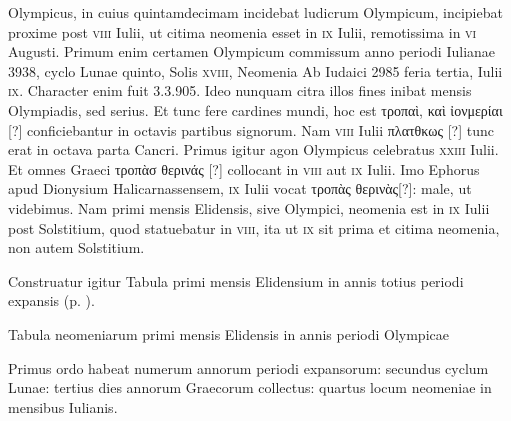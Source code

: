 Olympicus, in cuius quintamdecimam incidebat ludicrum Olympicum,
incipiebat proxime post \textsc{viii} Iulii, ut citima neomenia esset
 in \textsc{ix}
Iulii, remotissima in \textsc{vi} Augusti.
Primum enim certamen Olympicum
commissum anno periodi Iulianae 3938, cyclo Lunae quinto, Solis \textsc{xviii},
Neomenia Ab Iudaici 2985 feria tertia, Iulii \textsc{ix}.
Character enim fuit
3.3.905.
Ideo nunquam citra illos fines inibat mensis Olympiadis, sed
serius.
Et tunc fere cardines mundi, hoc est
 \textgreek{τροπαὶ, καὶ ἰονμερίαι [?]} conficiebantur
in octavis partibus signorum.
Nam \textsc{viii} Iulii \textgreek{πλατθκως [?]} tunc
erat in octava parta Cancri.
Primus igitur agon Olympicus celebratus
\textsc{xxiii} Iulii.
Et omnes Graeci \textgreek{τροπὰσ θερινάς [?]} collocant in
 \textsc{viii} aut \textsc{ix}
Iulii.
Imo Ephorus apud Dionysium Halicarnassensem, \textsc{ix} Iulii vocat
\textgreek{τροπὰς θερινὰς[?]}: male, ut videbimus.
Nam primi mensis Elidensis, sive
Olympici, neomenia est in \textsc{ix} Iulii post Solstitium, quod statuebatur
in \textsc{viii}, ita ut \textsc{ix} sit prima et citima neomenia,
 non autem Solstitium.


Construatur igitur Tabula primi mensis Elidensium
 in annis totius periodi
expansis (p. \pageref{tab:neomenia_elidensis}).
\begin{table}[htbp]
 \footnotesize
 \centering
 
 \caption{Tabula neomeniarum primi mensis Elidensis in annis periodi Olympicae}
 \label{tab:neomenia_elidensis}
\end{table}
%
Primus ordo habeat numerum annorum periodi expansorum:
secundus cyclum Lunae: tertius dies annorum Graecorum collectus:
quartus locum neomeniae in mensibus Iulianis.


